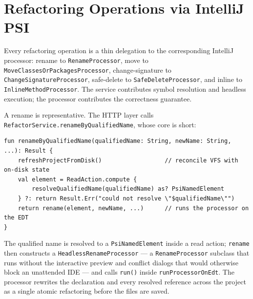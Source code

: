 \section{Refactoring Operations via IntelliJ PSI}
\label{sec:impl-refactor}
Every refactoring operation is a thin delegation to the corresponding IntelliJ
processor: rename to \texttt{RenameProcessor}, move to
\texttt{MoveClassesOrPackagesProcessor}, change-signature to
\texttt{ChangeSignatureProcessor}, safe-delete to \texttt{SafeDeleteProcessor}, and
inline to \texttt{InlineMethodProcessor}. The service contributes symbol resolution and
headless execution; the processor contributes the correctness guarantee.

A rename is representative. The HTTP layer calls
\texttt{RefactorService.renameByQualifiedName}, whose core is short:
\begin{lstlisting}[basicstyle=\ttfamily\footnotesize]
fun renameByQualifiedName(qualifiedName: String, newName: String, ...): Result {
    refreshProjectFromDisk()                  // reconcile VFS with on-disk state
    val element = ReadAction.compute {
        resolveQualifiedName(qualifiedName) as? PsiNamedElement
    } ?: return Result.Err("could not resolve \"$qualifiedName\"")
    return rename(element, newName, ...)      // runs the processor on the EDT
}
\end{lstlisting}
The qualified name is resolved to a \texttt{PsiNamedElement} inside a read action;
\texttt{rename} then constructs a \texttt{HeadlessRenameProcessor} --- a
\texttt{RenameProcessor} subclass that runs without the interactive preview and
conflict dialogs that would otherwise block an unattended IDE --- and calls
\texttt{run()} inside \texttt{runProcessorOnEdt}. The processor rewrites the declaration
and every resolved reference across the project as a single atomic refactoring before
the files are saved.

